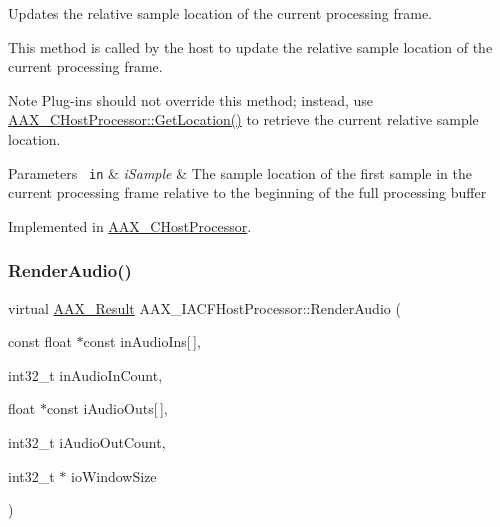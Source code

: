 Updates the relative sample location of the current processing frame. 

This method is called by the host to update the relative sample location of the current processing frame.

\begin{DoxyNote}{Note}
Plug-\/ins should not override this method; instead, use \mbox{\hyperlink{a01485_a8d554bfd981a41e180530bef2ebbf9e3}{A\+A\+X\+\_\+\+C\+Host\+Processor\+::\+Get\+Location()}} to retrieve the current relative sample location.
\end{DoxyNote}

\begin{DoxyParams}[1]{Parameters}
\mbox{\texttt{ in}}  & {\em i\+Sample} & The sample location of the first sample in the current processing frame relative to the beginning of the full processing buffer \\
\hline
\end{DoxyParams}


Implemented in \mbox{\hyperlink{a01485_a35430586fa6800db61b6db563b73a6b1}{A\+A\+X\+\_\+\+C\+Host\+Processor}}.

\mbox{\label{a01693_a29f1352c77cdcce8dbac4d32f1a88887}} 
\subsubsection{\texorpdfstring{RenderAudio()}{RenderAudio()}}
{\footnotesize\ttfamily virtual \mbox{\hyperlink{a00392_a4d8f69a697df7f70c3a8e9b8ee130d2f}{A\+A\+X\+\_\+\+Result}} A\+A\+X\+\_\+\+I\+A\+C\+F\+Host\+Processor\+::\+Render\+Audio (\begin{DoxyParamCaption}\item[{const float $\ast$const}]{in\+Audio\+Ins\mbox{[}$\,$\mbox{]},  }\item[{int32\+\_\+t}]{in\+Audio\+In\+Count,  }\item[{float $\ast$const}]{i\+Audio\+Outs\mbox{[}$\,$\mbox{]},  }\item[{int32\+\_\+t}]{i\+Audio\+Out\+Count,  }\item[{int32\+\_\+t $\ast$}]{io\+Window\+Size }\end{DoxyParamCaption})\hspace{0.3cm}{\ttfamily [pure virtual]}}



